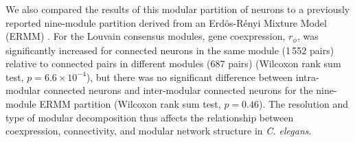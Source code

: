 \documentclass[10pt,letterpaper]{article}
\begin{document}
{We also compared the results of this modular partition of neurons to a previously reported nine-module partition derived from an Erd\"os-R\'enyi Mixture Model (ERMM) \cite{Pavlovic:2014gx}.
For the Louvain consensus modules, gene coexpression, $r_\phi$, was significantly increased for connected neurons in the same module (1\,552 pairs) relative to connected pairs in different modules (687 pairs) (Wilcoxon rank sum test, $p = 6.6 \times 10^{-4}$), but there was no significant difference between intra-modular connected neurons and inter-modular connected neurons for the nine-module ERMM partition (Wilcoxon rank sum test, $p = 0.46$).
The resolution and type of modular decomposition thus affects the relationship between coexpression, connectivity, and modular network structure in \emph{C. elegans}.
}
\end{document}

